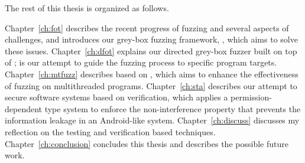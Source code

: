 The rest of this thesis is organized as follows.

Chapter~\ref{ch:fot} describes the recent progress of fuzzing and several aspects of challenges, and introduces our grey-box fuzzing framework, \FOT, which aims to solve these issues. Chapter~\ref{ch:dfot} explains our directed grey-box fuzzer \dFOT built on top of \FOT; \dFOT is our attempt to guide the fuzzing process to specific program targets. Chapter~\ref{ch:mtfuzz} describes \mtfuzz based on \FOT, which aims to enhance the effectiveness of fuzzing on multithreaded programs. Chapter~\ref{ch:sta} describes our attempt to secure software systems based on verification, which applies a permission-dependent type system to enforce the non-interference property that prevents the information leakage in an Android-like system. Chapter~\ref{ch:discuss} discusses my reflection on the testing and verification based techniques. Chapter~\ref{ch:conclusion} concludes this thesis and describes the possible future work.